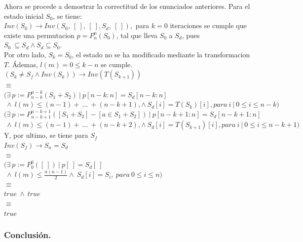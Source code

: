 \documentclass[12pt, a4paper]{article}
\begin{document}
Ahora se procede a demostrar la correctitud de los enunciados anteriores. Para el estado inicial $S_0$, se tiene: \\

$Inv(S_0) \rightarrow Inv(S_0,~[~],~[~], S_d,~[~]),$ para $k = 0$ iteraciones se cumple que existe
una permutacion $p = P_n^n(S_0)$, tal que lleva $S_0$ a $S_d$, pues $S_0~\subseteq S_d \land S_d \subseteq S_0$. \\
Por otro lado, $S_k = S_0$, el estado no se ha modificado mediante la transformacion $T$. Ádemas, $l(m) = 0 \leq k-n$ se cumple. \\
$( S_k \neq S_f \land Inv(S_k)) \rightarrow Inv(T(S_{k+1}))$ \\
$\equiv$ \\
$(\exists~p := P_{n-k}^{n-k} ( S_1  + S_2)~|~p[n-k:n] = S_d[n-k:n]$ $~\land~l(m) \leq (n-1) +~\ldots~+ (n-k+1), \land ~S_d[i] = T(S_k)[i],para~ i~|~0 \leq i \leq n-k)$ \\
$(\exists~p := P_{n-k+1}^{n-k+1} ([S_1+ S_2]-[a \in S_1 + S_2])~|~p[n-k+1:n] = S_d[n-k+1:n]$ $~\land~l(m) \leq (n-1) +~\ldots~+ (n-k+2), \land ~S_d[i] = T(S_{k+1})[i],para~ i~|~0 \leq i \leq n-k+1)$ \\
Y, por ultimo, se tiene para $S_f$ \\
$Inv(S_f) \rightarrow S_n = S_d$ \\
$\equiv$ \\
$(\exists~p := P_0^0 ([~])~|~p[~] = S_d[~]$ $~\land~l(m) \leq \frac{n(n-1)}{2} \land ~S_d[i] = S_{i}, ~para~0 \leq i \leq n)$ \\
$\equiv$ \\
$true~\land~true$ \\
$\equiv$ \\
$true$
\subsubsection{Conclusión.}
\end{document}
